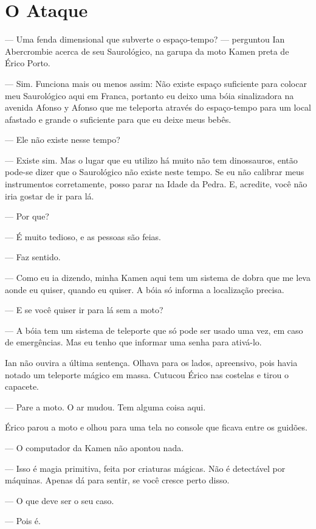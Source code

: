\chapter{O Ataque}

--- Uma fenda dimensional que subverte o espaço-tempo? --- perguntou Ian
Abercrombie acerca de seu Saurológico, na garupa da moto Kamen preta de Érico
Porto.

--- Sim. Funciona mais ou menos assim: Não existe espaço suficiente para
colocar meu Saurológico aqui em Franca, portanto eu deixo uma bóia sinalizadora
na avenida Afonso y Afonso que me teleporta através do espaço-tempo para um
local afastado e grande o suficiente para que eu deixe meus bebês.

--- Ele não existe nesse tempo?

--- Existe sim. Mas o lugar que eu utilizo há muito não tem dinossauros, então
pode-se dizer que o Saurológico não existe neste tempo. Se eu não calibrar meus
instrumentos corretamente, posso parar na Idade da Pedra. E, acredite, você não
iria gostar de ir para lá.

--- Por que?

--- É muito tedioso, e as pessoas são feias.

--- Faz sentido.

--- Como eu ia dizendo, minha Kamen aqui tem um sistema de dobra que me leva
aonde eu quiser, quando eu quiser. A bóia só informa a localização precisa.

--- E se você quiser ir para lá sem a moto?

--- A bóia tem um sistema de teleporte que só pode ser usado uma vez, em caso
de emergências. Mas eu tenho que informar uma senha para ativá-lo.

Ian não ouvira a última sentença. Olhava para os lados, apreensivo, pois havia
notado um teleporte mágico em massa. Cutucou Érico nas costelas e tirou o
capacete.

--- Pare a moto. O ar mudou. Tem alguma coisa aqui.

Érico parou a moto e olhou para uma tela no console que ficava entre os
guidões.

--- O computador da Kamen não apontou nada.

--- Isso é magia primitiva, feita por criaturas mágicas. Não é detectável por
máquinas. Apenas dá para sentir, se você cresce perto disso.

--- O que deve ser o seu caso.

--- Pois é.

